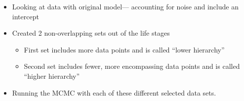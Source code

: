 \documentclass[letterpaper,index=totoc,hyperref,openany]{labbook} %
\begin{document}










\begin{itemize}
  \item Looking at data with original model— accounting for noise and include an intercept
  \item Created 2 non-overlapping sets out of the life stages
    \begin{itemize}
	\item First set includes more data points and is called “lower hierarchy” 
	\item Second set includes fewer, more encompassing data points and is called “higher hierarchy”
    \end{itemize}
  \item Running the MCMC with each of these different selected data sets.
  \end{itemize}
\end{document}
